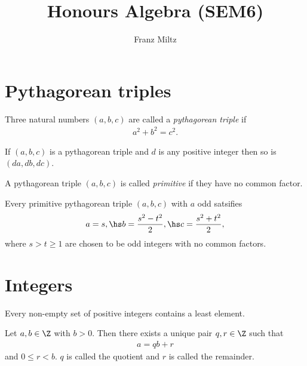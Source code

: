 \documentclass{article}
\begin{document}
\mkthmstwounified
\title{Honours Algebra (SEM6)}
\author{Franz Miltz}
\maketitle
\tableofcontents
\pagebreak

\section{Pythagorean triples}

\begin{definition}
    Three natural numbers $(a,b,c)$ are called a \emph{pythagorean triple} if
    \begin{align*}
        a^2 + b^2 = c^2.
    \end{align*}
\end{definition}

\begin{lemma}
    If $(a,b,c)$ is a pythagorean triple and $d$ is any positive integer then
    so is $(da,db,dc)$.
\end{lemma}

\begin{definition}
    A pythagorean triple $(a,b,c)$ is called \emph{primitive} if they have no common factor.
\end{definition}

\begin{theorem}
    Every primitive pythagorean triple $(a,b,c)$ with $a$ odd satsifies
    \begin{align*}
        a=s,\hs b=\frac{s^2-t^2}{2},\hs c=\frac{s^2+t^2}{2},
    \end{align*}
    where $s>t\geq 1$ are chosen to be odd integers with no common factors.
\end{theorem}

\section{Integers}

\begin{theorem}
    Every non-empty set of positive integers contains a least element.
\end{theorem}

\begin{theorem}
    Let $a,b\in\Z$ with $b>0$. Then there exists a unique pair $q,r\in\Z$ such that
    \begin{align*}
        a = qb + r
    \end{align*}
    and $0\leq r<b$. $q$ is called the quotient and $r$ is called the remainder.
\end{theorem}
\end{document}
